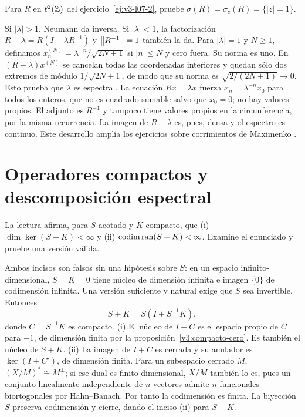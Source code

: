 \begin{ejercicio}\label{ej:v3-ampl-shift}
Para $R$ en $\ell^2(\mathbb Z)$ del ejercicio~\ref{ej:v3-l07-2}, pruebe $\sigma(R)=\sigma_c(R)=\{|z|=1\}$.
\end{ejercicio}
\begin{solucion}
Si $|\lambda|>1$, Neumann da inversa. Si $|\lambda|<1$, la factorización $R-\lambda=R(I-\lambda R^{-1})$ y $\left\lVert R^{-1}\right\rVert=1$ también la da. Para $|\lambda|=1$ y $N\ge1$, definamos $x^{(N)}_n=\lambda^{-n}/\sqrt{2N+1}$ si $|n|\le N$ y cero fuera. Su norma es uno. En $(R-\lambda)x^{(N)}$ se cancelan todas las coordenadas interiores y quedan sólo dos extremos de módulo $1/\sqrt{2N+1}$, de modo que su norma es $\sqrt{2/(2N+1)}\to0$. Esto prueba que $\lambda$ es espectral. La ecuación $Rx=\lambda x$ fuerza $x_n=\lambda^{-n}x_0$ para todos los enteros, que no es cuadrado-sumable salvo que $x_0=0$; no hay valores propios. El adjunto es $R^{-1}$ y tampoco tiene valores propios en la circunferencia, por la misma recurrencia. La imagen de $R-\lambda$ es, pues, densa y el espectro es continuo. Este desarrollo amplía los ejercicios sobre corrimientos de Maximenko \cite{maxshift}.
\end{solucion}

\chapter{Operadores compactos y descomposición espectral}

\begin{ejercicio}\label{ej:v3-l10-1}
La lectura afirma, para $S$ acotado y $K$ compacto, que (i) $\dim\ker(S+K)<\infty$ y (ii) $\operatorname{codim}\operatorname{ran}(S+K)<\infty$. Examine el enunciado y pruebe una versión válida.
\end{ejercicio}
\begin{solucion}
Ambos incisos son falsos sin una hipótesis sobre $S$: en un espacio infinito-dimensional, $S=K=0$ tiene núcleo de dimensión infinita e imagen $\{0\}$ de codimensión infinita. Una versión suficiente y natural exige que $S$ sea invertible. Entonces
\[S+K=S(I+S^{-1}K),
\]
donde $C=S^{-1}K$ es compacto. (i) El núcleo de $I+C$ es el espacio propio de $C$ para $-1$, de dimensión finita por la proposición~\ref{v3:compacto-cero}. Es también el núcleo de $S+K$. (ii) La imagen de $I+C$ es cerrada y su anulador es $\ker(I+C')$, de dimensión finita. Para un subespacio cerrado $M$, $(X/M)^*\cong M^\perp$; si ese dual es finito-dimensional, $X/M$ también lo es, pues un conjunto linealmente independiente de $n$ vectores admite $n$ funcionales biortogonales por Hahn--Banach. Por tanto la codimensión es finita. La biyección $S$ preserva codimensión y cierre, dando el inciso (ii) para $S+K$.
\end{solucion}

